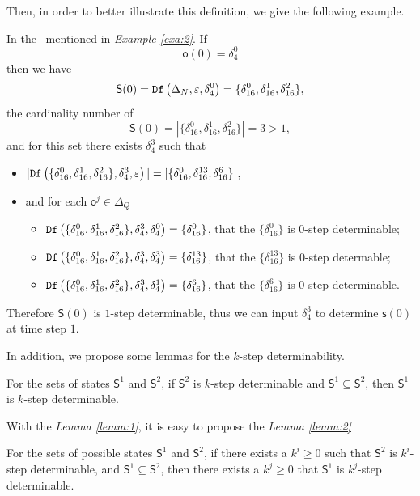  Then, in order to better illustrate this definition, we give the following example.
\begin{example}
In the \BCN\ mentioned in {\em Example \ref{exa:2}}. If \[\mathsf{o}(0)=\delta_4^0\] then we have \[\mathsf{S}(0)={\tt Df}\left(\Delta_N,\varepsilon,\delta_4^0\right)=\{\delta_{16}^0,\delta_{16}^1,\delta_{16}^2\},\] the cardinality number of \[\mathsf{S}(0)=|\{\delta_{16}^0,\delta_{16}^1,\delta_{16}^2\}|=3>1,\] and for this set there exists $\delta_{4}^3$ such that 
 \begin{itemize}
 \item  $|{\tt Df}\left(\{\delta_{16}^0,\delta_{16}^1,\delta_{16}^2\},\delta_{4}^3,\varepsilon\right)|=|\{\delta_{16}^0,\delta_{16}^{13},\delta_{16}^6\}|$,
 \item   and for each $\mathsf{o}^{j}\in \Delta_Q$
  \begin{itemize}
  \item   ${\tt Df}\left(\{\delta_{16}^0,\delta_{16}^1,\delta_{16}^2\},\delta_{4}^3,\delta_{4}^0\right)=\{\delta_{16}^0\}$, that the $\{\delta_{16}^0\}$ is $0$-step determinable;
 \item  ${\tt Df}\left(\{\delta_{16}^0,\delta_{16}^1,\delta_{16}^2\},\delta_{4}^3,\delta_{4}^3\right)=\{\delta_{16}^{13}\}$, that the $\{\delta_{16}^{13}\}$ is $0$-step determable;
  \item  ${\tt Df}\left(\{\delta_{16}^0,\delta_{16}^1,\delta_{16}^2\},\delta_{4}^3,\delta_{4}^1\right)=\{\delta_{16}^{6}\}$, that the $\{\delta_{16}^{6}\}$ is $0$-step determinable.
 \end{itemize}
 \end{itemize}
 Therefore $\mathsf{S}(0)$ is $1$-step determinable, thus we can  input $\delta_{4}^3$ to determine $\mathsf{s}(0)$ at time step $1$.
\label{exa:9}
\end{example}  

In addition, we propose some lemmas for the $k$-step determinability.

\begin{lemma}
For the sets of states $\mathsf{S}^{1}$ and $\mathsf{S}^{2}$, if $\mathsf{S}^{2}$ is $k$-step determinable and $\mathsf{S}^{1}\subseteq \mathsf{S}^{2}$, then $\mathsf{S}^{1}$ is $k$-step determinable.
  \label{lemm:1}
\end{lemma}

With the {\em Lemma \ref{lemm:1}}, it is easy to propose the {\em Lemma \ref{lemm:2}}
\begin{lemma}
For the sets of possible states $\mathsf{S}^{1}$ and $\mathsf{S}^{2}$, if there exists a $k^{i}\ge 0$ such that $\mathsf{S}^{2}$ is $k^{i}$-step determinable, and $\mathsf{S}^{1}\subseteq \mathsf{S}^{2}$, then there exists a $k^{j}\ge 0$ that $\mathsf{S}^{1}$ is $k^{j}$-step determinable.
\label{lemm:2}
\end{lemma}

